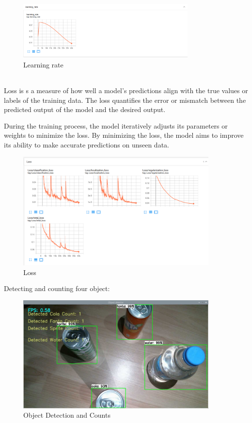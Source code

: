 \begin{figure}[!htbp]
    \centering
    \includegraphics[width=0.8\textwidth]{Imgs/learning_rate.png}
    \caption{\label{fig:learning_rate}Learning rate}
\end{figure}
\\

Loss is s a measure of how well a model's predictions align with the true values or labels of the training data. The loss quantifies the error or mismatch between the predicted output of the model and the desired output.

During the training process, the model iteratively adjusts its parameters or weights to minimize the loss. By minimizing the loss, the model aims to improve its ability to make accurate predictions on unseen data.

\begin{figure}[!htbp]
    \centering
    \includegraphics[width=0.9\textwidth]{Imgs/loss.PNG}
    \caption{\label{fig:loss}Loss}
\end{figure}

Detecting and counting four object:

\begin{figure}[!htbp]
    \centering
    \includegraphics[width=0.9\textwidth]{Imgs/object_counts.PNG}
    \caption{\label{fig:loss}Object Detection and Counts}
\end{figure}

